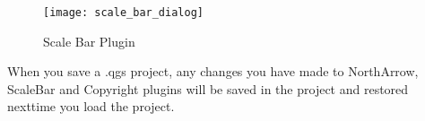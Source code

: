 \begin{figure}[ht]
   \centering
   \texttt{[image: scale\_bar\_dialog]}   
   \caption{Scale Bar Plugin \nixcaption}\label{fig:scale_bar}
\end{figure}

\begin{Tip}\caption{\textsc{Plugins Settings Saved to Project}}
When you save a .qgs project, any changes you have made to NorthArrow, ScaleBar and Copyright plugins will be saved in the project and restored nexttime you load the project.
\end{Tip}

\FloatBarrier

